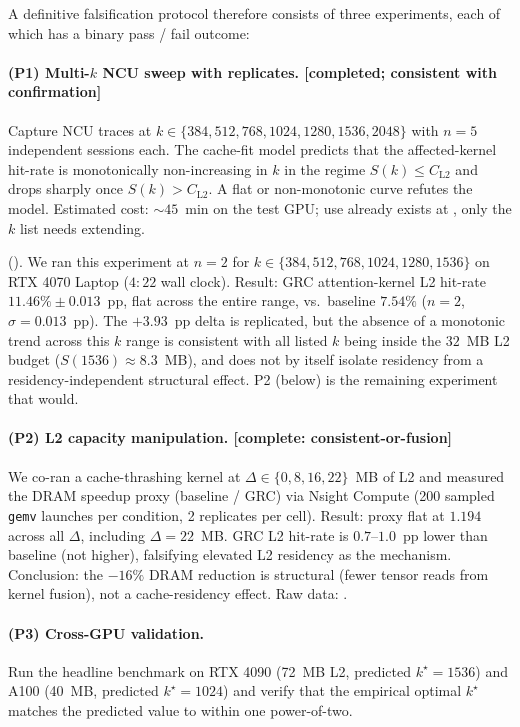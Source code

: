 \documentclass[11pt]{article}
\begin{document}
A definitive falsification protocol therefore consists of three
experiments, each of which has a binary pass / fail outcome:

\paragraph{(P1) Multi-$k$ NCU sweep with replicates. [completed; consistent with confirmation]}
Capture NCU traces at $k\in\{384, 512, 768, 1024, 1280, 1536, 2048\}$
with $n{=}5$ independent sessions each. The cache-fit model predicts
that the affected-kernel hit-rate is monotonically non-increasing in $k$
in the regime $S(k)\le C_\text{L2}$ and drops sharply once
$S(k)>C_\text{L2}$. A flat or non-monotonic curve refutes the model.
Estimated cost: ${\sim}45$~min on the test GPU; use already exists at
, only the $k$ list needs
extending.

\smallskip\noindentUpdate ().
We ran this experiment at $n{=}2$ for $k\in\{384,512,768,1024,1280,1536\}$
on RTX 4070 Laptop ($4{:}22$ wall clock). Result: GRC attention-kernel
L2 hit-rate $11.46\%\pm 0.013$~pp, flat across the entire range, vs.\
baseline $7.54\%$ ($n{=}2$, $\sigma{=}0.013$~pp). The $+3.93$~pp delta
is replicated, but the absence of a monotonic trend across this $k$ range
is consistent with all listed $k$ being inside the $32$~MB L2 budget
($S(1536)\approx 8.3$~MB), and does not by itself isolate residency
from a residency-independent structural effect. P2 (below) is the
remaining experiment that would.

\paragraph{(P2) L2 capacity manipulation. [complete: consistent-or-fusion]}
We co-ran a cache-thrashing kernel at $\Delta\in\{0, 8, 16, 22\}$~MB of
L2 and measured the DRAM speedup proxy (baseline / GRC) via Nsight Compute
(200 sampled \texttt{gemv} launches per condition, 2 replicates per cell).
Result: proxy flat at $1.194$ across all $\Delta$, including $\Delta{=}22$~MB.
GRC L2 hit-rate is $0.7$--$1.0$~pp lower than baseline (not higher),
falsifying elevated L2 residency as the mechanism.
Conclusion: the $-16\%$ DRAM reduction is structural (fewer tensor reads
from kernel fusion), not a cache-residency effect.
Raw data: .

\paragraph{(P3) Cross-GPU validation.}
Run the headline benchmark on RTX 4090 (72~MB L2, predicted
$k^\star{=}1536$) and A100 (40~MB, predicted $k^\star{=}1024$) and
verify that the empirical optimal $k^\star$ matches the predicted
value to within one power-of-two.
\end{document}
